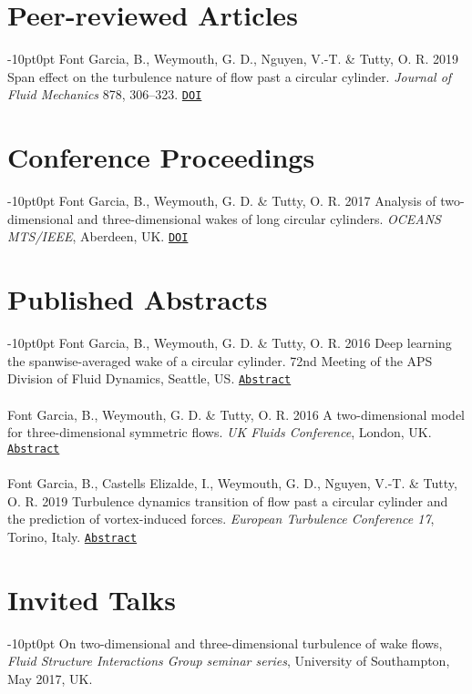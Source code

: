 \documentclass[line]{res}
\newenvironment{p}
  {\begin{adjustwidth}{-10pt}{0pt}}
  {\end{adjustwidth}}
\begin{document}
\begin{resume}
\section{Peer-reviewed Articles}
\begin{p}
Font Garcia, B., Weymouth, G. D., Nguyen, V.-T. \& Tutty, O. R. 2019 Span effect on the turbulence nature of flow past a circular cylinder. \textit{Journal of Fluid Mechanics} 878, 306--323. \href{https://doi.org/10.1017/jfm.2019.637}{\texttt{DOI}}
\end{p}

\section{Conference Proceedings}
\begin{p}
Font Garcia, B., Weymouth, G. D.  \&  Tutty, O. R. 2017 Analysis of two-dimensional and three-dimensional wakes of long circular cylinders. {\em OCEANS MTS/IEEE}, Aberdeen, 	UK. \href{https://doi.org/10.1109/OCEANSE.2017.8084904}{\texttt{DOI}}
\end{p}

\section{Published Abstracts}
\begin{p}
Font Garcia, B., Weymouth, G. D.  \&  Tutty, O. R. 2016  Deep learning the spanwise-averaged wake of a circular cylinder. 72nd Meeting of the APS Division of Fluid Dynamics, Seattle, US.  \href{https://meetings.aps.org/Meeting/DFD19/Session/L17.5}{\texttt{Abstract}}\\
\\
Font Garcia, B., Weymouth, G. D.  \&  Tutty, O. R. 2016  A two-dimensional model for three-dimensional symmetric flows. \textit{UK Fluids Conference}, London, UK.  \href{https://www.imperial.ac.uk/media/imperial-college/faculty-of-engineering/aeronautics/UK-Fluids-Conference-2016-booklet.pdf}{\texttt{Abstract}}\\
\\
Font Garcia, B., Castells Elizalde, I., Weymouth, G. D., Nguyen, V.-T.  \&  Tutty, O. R. 2019  Turbulence dynamics transition of flow past a circular cylinder and the prediction of vortex-induced forces. \textit{European Turbulence Conference 17}, Torino, Italy.  \href{https://etc17.fyper.com/program/show_slot/41}{\texttt{Abstract}}
\end{p}

\section{Invited Talks}
\begin{p}
On two-dimensional and three-dimensional turbulence of wake flows, \textit{Fluid Structure Interactions Group seminar series}, University of Southampton, May 2017, UK.
\end{p}


\end{resume}
\end{document}
